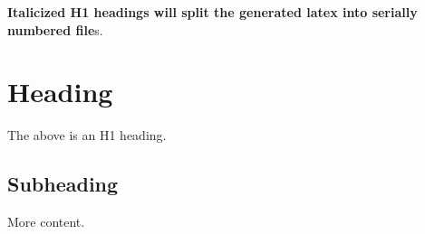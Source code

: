 
\textbf{Italicized H1 headings will split the generated latex into serially numbered file}s. 




\section{\texorpdfstring{\textbf{Heading}}{Heading}} 


The above is an H1 heading. 



\subsection{Subheading} 


More content. 




